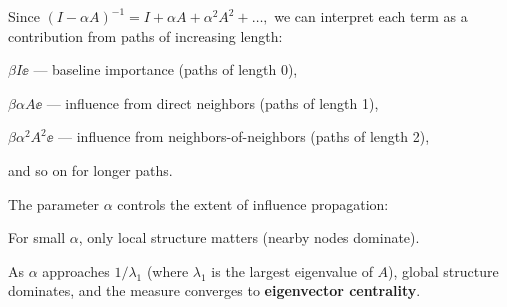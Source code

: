 Since
$
(I - \alpha A)^{-1} = I + \alpha A + \alpha^2 A^2 + \dots,
$
we can interpret each term as a contribution from paths of increasing length:

\begin{tightitemize}
    \item $\beta I \ee$ — baseline importance (paths of length 0),
    \item $\beta \alpha A \ee$ — influence from direct neighbors (paths of length 1),
    \item $\beta \alpha^2 A^2 \ee$ — influence from neighbors-of-neighbors (paths of length 2),
    \item and so on for longer paths.
\end{tightitemize}

\noindent
The parameter $\alpha$ controls the extent of influence propagation:
\begin{tightitemize}
    \item For small $\alpha$, only local structure matters (nearby nodes dominate).
    \item As $\alpha$ approaches $1 / \lambda_1$ (where $\lambda_1$ is the largest eigenvalue of $A$), global structure dominates, and the measure converges to \textbf{eigenvector centrality}.
\end{tightitemize}
